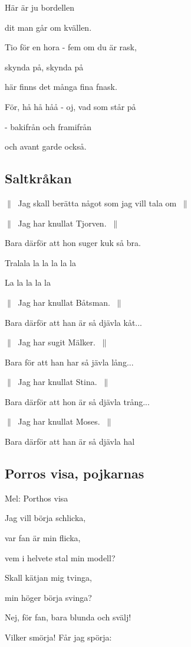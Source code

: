 Här är ju bordellen

dit man går om kvällen.

Tio för en hora - fem om du är rask,

skynda på, skynda  på

här finns det många fina fnask.

För, hå hå håå - oj, vad som står på

- bakifrån och framifrån

och avant garde också.

\subsection{\textbf{Saltkråkan}}

$\|\:$ Jag skall berätta något som jag vill tala om $\:\|$

$\|\:$ Jag har knullat Tjorven. $\:\|$

Bara därför att hon suger kuk så bra.

Tralala la la la la la

La la la la la\bigskip

$\|\:$ Jag har knullat Båtsman. $\:\|$

Bara därför att han är så djävla kåt...\bigskip

$\|\:$ Jag har sugit Mälker. $\:\|$

Bara för att han har så jävla lång...\bigskip

$\|\:$ Jag har knullat Stina. $\:\|$

Bara därför att hon är så djävla trång...\bigskip

$\|\:$ Jag har knullat Moses. $\:\|$

Bara därför att han är så djävla hal\bigskip

\subsection{\textbf{Porros visa, pojkarnas}}

Mel: Porthos visa\bigskip

Jag vill börja schlicka, 

var fan är min flicka,

vem i helvete stal min modell?

Skall kätjan mig tvinga,

min höger börja svinga?

Nej, för fan, bara blunda och svälj!

Vilker smörja! Får jag spörja:

